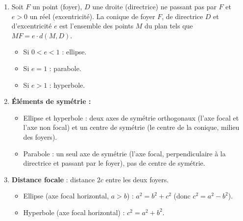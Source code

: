 \documentclass[11pt]{article}
\newcommand{\cle}[1]{{\popxbold\color{popdark}#1}}
\begin{document}
\begin{corrige}
\begin{enumerate}
\item Soit $F$ un point (foyer), $D$ une droite (directrice) ne passant pas par $F$ et $e > 0$ un réel (excentricité). La conique de foyer $F$, de directrice $D$ et d'excentricité $e$ est l'ensemble des points $M$ du plan tels que $MF = e \cdot d(M, D)$.
  \begin{itemize}
    \item Si $0 < e < 1$ : \cle{ellipse}.
    \item Si $e = 1$ : \cle{parabole}.
    \item Si $e > 1$ : \cle{hyperbole}.
  \end{itemize}
\item \textbf{Éléments de symétrie :}
  \begin{itemize}
    \item Ellipse et hyperbole : deux axes de symétrie orthogonaux (l'\cle{axe focal} et l'\cle{axe non focal}) et un centre de symétrie (le \cle{centre} de la conique, milieu des foyers).
    \item Parabole : un seul axe de symétrie (l'axe focal, perpendiculaire à la directrice et passant par le foyer), pas de centre de symétrie.
  \end{itemize}
\item \textbf{Distance focale} : distance $2c$ entre les deux foyers.
  \begin{itemize}
    \item Ellipse (axe focal horizontal, $a > b$) : $a^{2} = b^{2} + c^{2}$ (donc $c^{2} = a^{2} - b^{2}$).
    \item Hyperbole (axe focal horizontal) : $c^{2} = a^{2} + b^{2}$.
  \end{itemize}
\end{enumerate}
\end{corrige}
\end{document}
